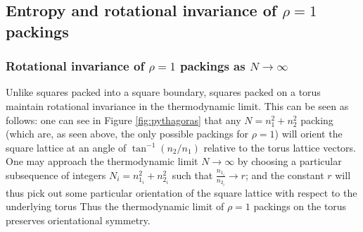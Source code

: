 \subsection{Entropy and rotational invariance of $\rho=1$ packings}




\subsubsection{Rotational invariance of $\rho=1$ packings as $N \rightarrow \infty$}

Unlike squares packed into a square boundary, squares packed on a torus maintain rotational invariance in the thermodynamic limit.  This can be seen as follows: one can see in Figure \ref{fig:pythagoras} that any $N=n_1^2+n_2^2$ packing (which are, as seen above, the only possible packings for $\rho=1$) will orient the square lattice at an angle of $\tan^{-1}(n_2/n_1)$ relative to the torus lattice vectors.  One may approach the thermodynamic limit $N \rightarrow \infty$ by choosing a particular subsequence of integers $N_i=n_{1_i}^2+n_{2_i}^2$ such that 
$\frac{n_{1_i}}{n_{2_i}} \rightarrow r$; and the constant $r$ will thus pick out some particular orientation of the square lattice with respect to the underlying torus 
Thus the thermodynamic limit of $\rho=1$ packings on the torus  preserves orientational symmetry.

